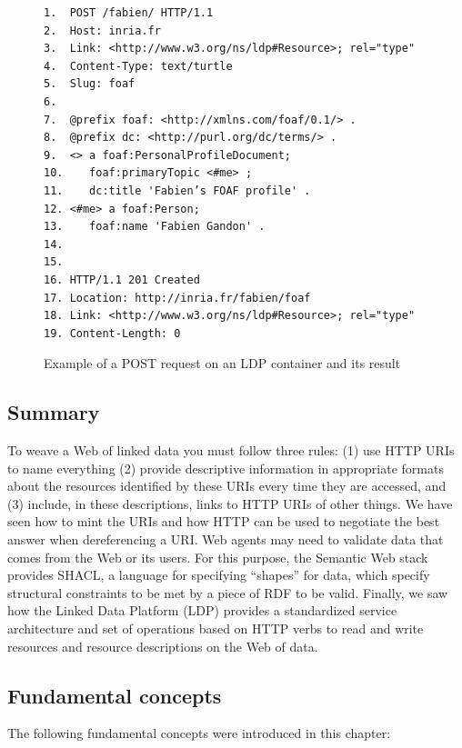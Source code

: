 \begin{figure}
  
    \label{fig:ch5.18}
\begin{lstlisting}
1.	POST /fabien/ HTTP/1.1
2.	Host: inria.fr
3.	Link: <http://www.w3.org/ns/ldp#Resource>; rel="type"
4.	Content-Type: text/turtle
5.	Slug: foaf
6.	
7.	@prefix foaf: <http://xmlns.com/foaf/0.1/> .
8.	@prefix dc: <http://purl.org/dc/terms/> .
9.	<> a foaf:PersonalProfileDocument;
10.	   foaf:primaryTopic <#me> ;
11.	   dc:title 'Fabien’s FOAF profile' .
12.	<#me> a foaf:Person;
13.	   foaf:name 'Fabien Gandon' .
14.	 
15.	 
16.	HTTP/1.1 201 Created
17.	Location: http://inria.fr/fabien/foaf
18.	Link: <http://www.w3.org/ns/ldp#Resource>; rel="type"
19.	Content-Length: 0

\end{lstlisting}
  \caption{Example of a POST request on an LDP container and its result}
  \end{figure}

\hypertarget{summary}{%
\subsection{Summary}\label{summary}}

To weave a Web of linked data you must follow three rules: (1) use HTTP
URIs to name everything (2) provide descriptive information in
appropriate formats about the resources identified by these URIs every
time they are accessed, and (3) include, in these descriptions, links to
HTTP URIs of other things. We have seen how to mint the URIs and how
HTTP can be used to negotiate the best answer when dereferencing a URI.
Web agents may need to validate data that comes from the Web or its
users. For this purpose, the Semantic Web stack provides SHACL, a
language for specifying ``shapes'' for data, which specify structural
constraints to be met by a piece of RDF to be valid. Finally, we saw how
the Linked Data Platform (LDP) provides a standardized service
architecture and set of operations based on HTTP verbs to read and write
resources and resource descriptions on the Web of data.

\hypertarget{fundamental-concepts}{%
\subsection{Fundamental concepts}\label{fundamental-concepts}}

The following fundamental concepts were introduced in this chapter:


